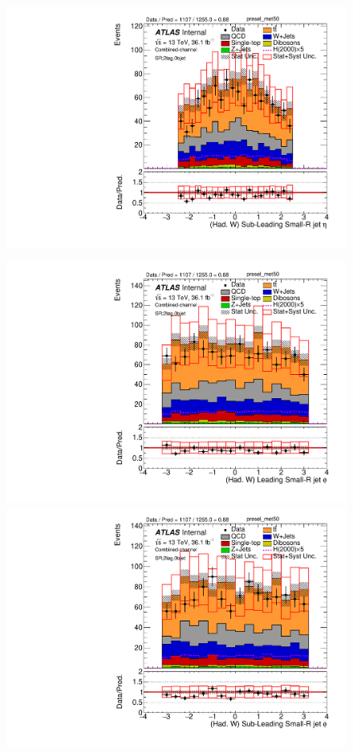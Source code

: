 \begin{figure}[!ht]
\begin{center}
\includegraphics[scale=0.33]{./figures/boosted/PlotsInMbbSR/Unblinded/DataMC_2tag_0bjet_SR_lepton_presel_met50_LightJet2Eta}\\
\par\medskip
\includegraphics[scale=0.33]{./figures/boosted/PlotsInMbbSR/Unblinded/DataMC_2tag_0bjet_SR_lepton_presel_met50_LightJet1Phi}
\includegraphics[scale=0.33]{./figures/boosted/PlotsInMbbSR/Unblinded/DataMC_2tag_0bjet_SR_lepton_presel_met50_LightJet2Phi}\\

\end{center}
\end{figure}
